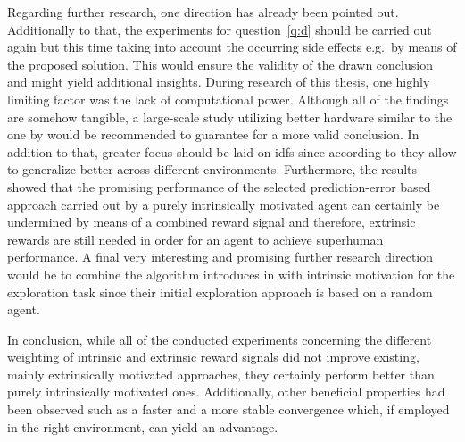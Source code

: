 \documentclass[draft,final]{vutinfth} %
\begin{document}
    Regarding further research, one direction has already been pointed out.
    Additionally to that, the experiments for question~\ref{q:d} should be carried out again but this time taking into account the occurring side effects e.g.\ by means of the proposed solution.
    This would ensure the validity of the drawn conclusion and might yield additional insights.
    During research of this thesis, one highly limiting factor was the lack of computational power.
    Although all of the findings are somehow tangible, a large-scale study utilizing better hardware similar to the one by \citet{burda_large-scale_2018-1} would be recommended to guarantee for a more valid conclusion.
    In addition to that, greater focus should be laid on \glspl{idf} since according to \citet{burda_large-scale_2018-1} they allow to generalize better across different environments.
    Furthermore, the results showed that the promising performance of the selected prediction-error based approach carried out by a purely intrinsically motivated agent can certainly be undermined by means of a combined reward signal and therefore, extrinsic rewards are still needed in order for an agent to achieve superhuman performance.
    A final very interesting and promising further research direction would be to combine the algorithm introduces in  with intrinsic motivation for the exploration task since their initial exploration approach is based on a random agent.

    In conclusion, while all of the conducted experiments concerning the different weighting of intrinsic and extrinsic reward signals did not improve existing, mainly extrinsically motivated approaches, they certainly perform better than purely intrinsically motivated ones.
    Additionally, other beneficial properties had been observed such as a faster and a more stable convergence which, if employed in the right environment, can yield an advantage.

    \backmatter
    \listoffigures %

    \cleardoublepage %
    \listoftables %

    \listofalgorithms
\end{document}
